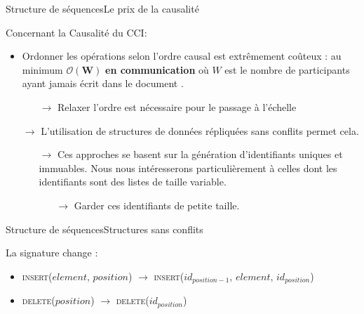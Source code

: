 \begin{frame}{Structure de séquences}{Le prix de la causalité}

  Concernant la Causalité du CCI:
  \begin{itemize}
  \item Ordonner les opérations selon l'ordre causal est extrêmement coûteux :
    au minimum $\pmb{\mathcal{O}(W)}$\textbf{ en communication} où $W$ est le
    nombre de participants ayant jamais écrit dans le document
    .
    \begin{itemize}
    \item[$\rightarrow$] Relaxer l'ordre est nécessaire pour le passage à l'échelle
    \end{itemize}
  \end{itemize}
  
  \vspace{0.5cm}
  
  \large
  \begin{itemize}
  \item [$\rightarrow$] L'utilisation de structures de données répliquées sans
    conflits  permet cela.
    \begin{itemize}
    \item [$\rightarrow$] Ces approches se basent sur la génération
      d'identifiants uniques et immuables. Nous nous intéresserons
      particulièrement à celles dont les identifiants sont des listes de taille
      variable.
      \begin{itemize}
      \item [$\rightarrow$] Garder ces identifiants de petite taille.
      \end{itemize}
    \end{itemize}
  \end{itemize}

\end{frame}

\begin{frame}{Structure de séquences}{Structures sans conflits}
  
  La signature change : 
  \begin{itemize}
  \item \textsc{insert}($element,\, position$) $\rightarrow$
    \textsc{insert}($id_{position-1},\, element,\, id_{position}$)
  \item \textsc{delete}($position$) $\rightarrow$ \textsc{delete}($id_{position}$)
  \end{itemize}

  \vspace{0.5cm}
  

  \begin{algorithm}[H]
    
  \end{algorithm}

\end{frame}


